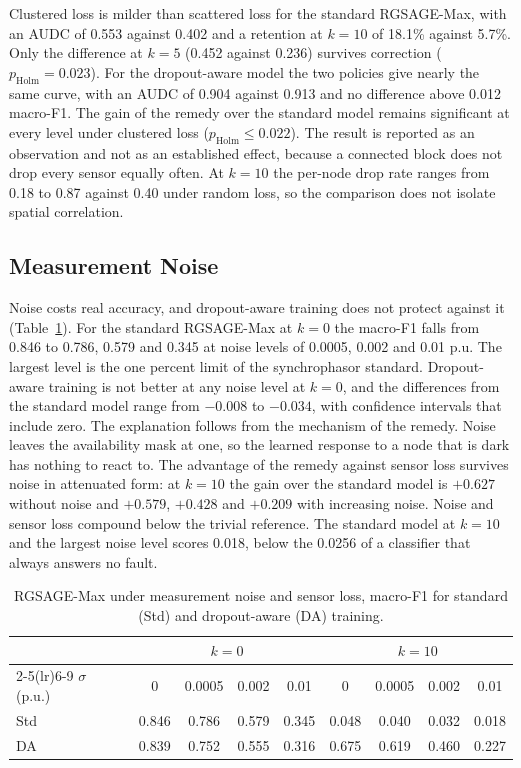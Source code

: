 \documentclass[MTech]{ugthesis}
\begin{document}
Clustered loss is milder than scattered loss for the standard RGSAGE-Max, with an \ac{AUDC} of 0.553 against 0.402 and a retention at $k=10$ of 18.1\% against 5.7\%. Only the difference at $k=5$ (0.452 against 0.236) survives correction ($p_{\mathrm{Holm}}=0.023$). For the dropout-aware model the two policies give nearly the same curve, with an \ac{AUDC} of 0.904 against 0.913 and no difference above 0.012 macro-F1. The gain of the remedy over the standard model remains significant at every level under clustered loss ($p_{\mathrm{Holm}}\le0.022$). The result is reported as an observation and not as an established effect, because a connected block does not drop every sensor equally often. At $k=10$ the per-node drop rate ranges from 0.18 to 0.87 against 0.40 under random loss, so the comparison does not isolate spatial correlation.

\subsection{Measurement Noise}

Noise costs real accuracy, and dropout-aware training does not protect against it (Table~\ref{tab:noise}). For the standard RGSAGE-Max at $k=0$ the macro-F1 falls from 0.846 to 0.786, 0.579 and 0.345 at noise levels of 0.0005, 0.002 and 0.01 p.u. The largest level is the one percent limit of the synchrophasor standard. Dropout-aware training is not better at any noise level at $k=0$, and the differences from the standard model range from $-0.008$ to $-0.034$, with confidence intervals that include zero. The explanation follows from the mechanism of the remedy. Noise leaves the availability mask at one, so the learned response to a node that is dark has nothing to react to. The advantage of the remedy against sensor loss survives noise in attenuated form: at $k=10$ the gain over the standard model is $+0.627$ without noise and $+0.579$, $+0.428$ and $+0.209$ with increasing noise. Noise and sensor loss compound below the trivial reference. The standard model at $k=10$ and the largest noise level scores 0.018, below the 0.0256 of a classifier that always answers no fault.

\begin{table}[htbp]
\caption{RGSAGE-Max under measurement noise and sensor loss, macro-F1 for standard (Std) and dropout-aware (DA) training.}
\label{tab:noise}
\small
\centering
\begin{tabular}{@{}lcccccccc@{}}
\toprule
 & \multicolumn{4}{c}{$k=0$} & \multicolumn{4}{c}{$k=10$} \\
\cmidrule(lr){2-5}\cmidrule(lr){6-9}
$\sigma$ (p.u.) & 0 & 0.0005 & 0.002 & 0.01 & 0 & 0.0005 & 0.002 & 0.01 \\
\midrule
Std & 0.846 & 0.786 & 0.579 & 0.345 & 0.048 & 0.040 & 0.032 & 0.018 \\
DA & 0.839 & 0.752 & 0.555 & 0.316 & 0.675 & 0.619 & 0.460 & 0.227 \\
\bottomrule
\end{tabular}
\end{table}
\end{document}
